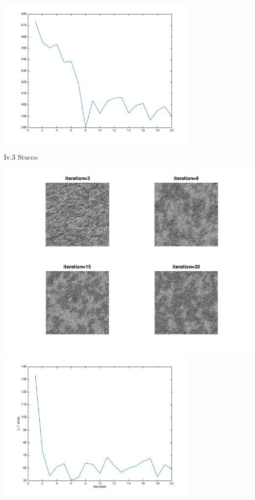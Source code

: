 \documentclass[12pt]{article}
\newenvironment{problem}[2][Part]{\begin{trivlist}
\item[\hskip \labelsep {\bfseries #1}\hskip \labelsep {\bfseries #2}]}{\end{trivlist}}
\begin{document}
\begin{problem}{IV Results}
\begin{center}
	\includegraphics[width=10cm]{Code/Results/grass_error.png}
\end{center}
\item{Iv.3 Stucco}
\begin{center}
	\includegraphics[width=14cm]{Code/Results/stucco.png}
	\includegraphics[width=10cm]{Code/Results/stucco_error.png}
\end{center}
\end{problem}
 
\end{document}

